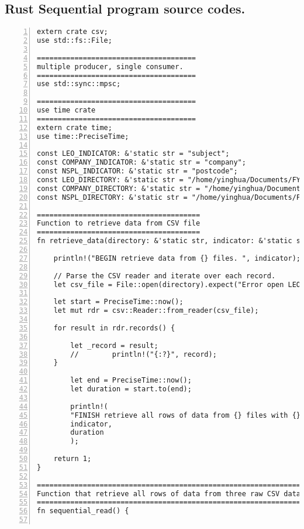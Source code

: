 \subsection{Rust Sequential program source codes.}

\lstset{basicstyle=\ttfamily\tiny}  
\begin{lstlisting}[breaklines, frame=single, numbers=left, caption={Rust sequential program source codes. (main.rs)}, label=commandline-02]
extern crate csv;
use std::fs::File;

======================================
multiple producer, single consumer.
======================================
use std::sync::mpsc;

======================================
use time crate
======================================
extern crate time;
use time::PreciseTime;

const LEO_INDICATOR: &'static str = "subject";
const COMPANY_INDICATOR: &'static str = "company";
const NSPL_INDICATOR: &'static str = "postcode";
const LEO_DIRECTORY: &'static str = "/home/yinghua/Documents/FYP1/FYP-data/subject-data/institution-subject-data.csv";
const COMPANY_DIRECTORY: &'static str = "/home/yinghua/Documents/FYP1/FYP-data/company-data/company-data-full.csv";
const NSPL_DIRECTORY: &'static str = "/home/yinghua/Documents/FYP1/FYP-data/postcode-data/UK-NSPL.csv";

=======================================
Function to retrieve data from CSV file 
=======================================
fn retrieve_data(directory: &'static str, indicator: &'static str) -> u32 {

	println!("BEGIN retrieve data from {} files. ", indicator);
	
	// Parse the CSV reader and iterate over each record.
	let csv_file = File::open(directory).expect("Error open LEO file");
	
	let start = PreciseTime::now();
	let mut rdr = csv::Reader::from_reader(csv_file);
	
	for result in rdr.records() {

		let _record = result;
		//        println!("{:?}", record);
	}
		
		let end = PreciseTime::now();
		let duration = start.to(end);
		
		println!(
		"FINISH retrieve all rows of data from {} files with {} seconds.",
		indicator,
		duration
		);
	
	return 1;
}

====================================================================
Function that retrieve all rows of data from three raw CSV datasets. 
====================================================================
fn sequential_read() {


\end{lstlisting}
